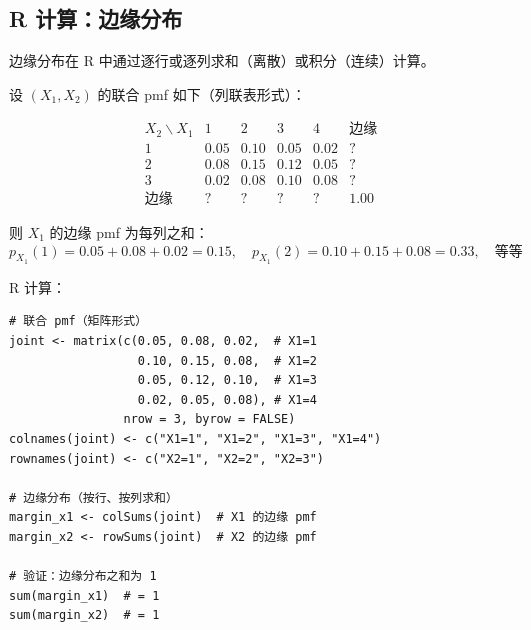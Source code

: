 \subsection{R 计算：边缘分布}

边缘分布在 R 中通过逐行或逐列求和（离散）或积分（连续）计算。

\begin{example}[离散边缘分布]\label{ex:marginal-discrete-ch2}
设 $(X_1, X_2)$ 的联合 pmf 如下（列联表形式）：

\[
\begin{array}{c|cccc|c}
X_2 \backslash X_1 & 1 & 2 & 3 & 4 & \text{边缘} \\ \hline
1 & 0.05 & 0.10 & 0.05 & 0.02 & ? \\
2 & 0.08 & 0.15 & 0.12 & 0.05 & ? \\
3 & 0.02 & 0.08 & 0.10 & 0.08 & ? \\ \hline
\text{边缘} & ? & ? & ? & ? & 1.00
\end{array}
\]

则 $X_1$ 的边缘 pmf 为每列之和：
\[
p_{X_1}(1) = 0.05 + 0.08 + 0.02 = 0.15, \quad
p_{X_1}(2) = 0.10 + 0.15 + 0.08 = 0.33, \quad \text{等等}
\]

R 计算：
\begin{verbatim}
# 联合 pmf（矩阵形式）
joint <- matrix(c(0.05, 0.08, 0.02,  # X1=1
                  0.10, 0.15, 0.08,  # X1=2
                  0.05, 0.12, 0.10,  # X1=3
                  0.02, 0.05, 0.08), # X1=4
                nrow = 3, byrow = FALSE)
colnames(joint) <- c("X1=1", "X1=2", "X1=3", "X1=4")
rownames(joint) <- c("X2=1", "X2=2", "X2=3")

# 边缘分布（按行、按列求和）
margin_x1 <- colSums(joint)  # X1 的边缘 pmf
margin_x2 <- rowSums(joint)  # X2 的边缘 pmf

# 验证：边缘分布之和为 1
sum(margin_x1)  # = 1
sum(margin_x2)  # = 1
\end{verbatim}
\end{example}

